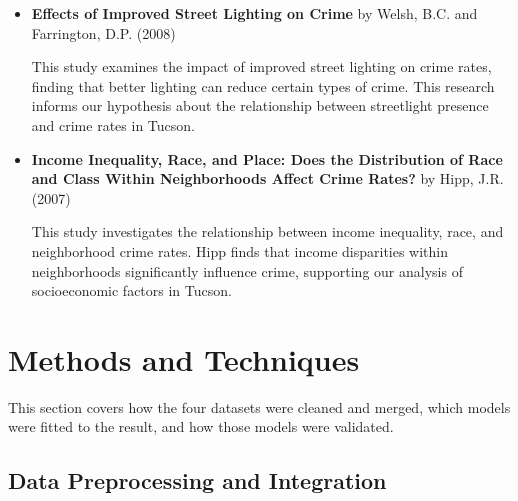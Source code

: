 \documentclass{report}
\begin{document}
\begin{itemize}
\item \textbf{Effects of Improved Street Lighting on Crime} by Welsh, B.C. and Farrington, D.P. (2008) \cite{welsh08}
  \par This study examines the impact of improved street lighting on crime rates, finding that better lighting can reduce certain types of crime. This research informs our hypothesis about the relationship between streetlight presence and crime rates in Tucson.
  
\item \textbf{Income Inequality, Race, and Place: Does the Distribution of Race and Class Within Neighborhoods Affect Crime Rates?} by Hipp, J.R. (2007) \cite{jr07}
  \par This study investigates the relationship between income inequality, race, and neighborhood crime rates. Hipp finds that income disparities within neighborhoods significantly influence crime, supporting our analysis of socioeconomic factors in Tucson.
\end{itemize}

\newpage
\section{Methods and Techniques}

\par This section covers how the four datasets were cleaned and merged, which models were fitted to the result, and how those models were validated.

\subsection{Data Preprocessing and Integration}
\end{document}
